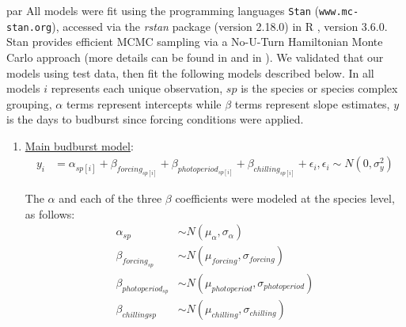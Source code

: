 \documentclass{article}
\begin{document}
par All models were fit using the programming languages \texttt{Stan} \citep{Carpenter:2016aa}(\texttt{www.mc-stan.org}), accessed via the \textit{rstan} package (version 2.18.0) in R \citep{Rcore:2017,rstan2018}, version 3.6.0. Stan provides efficient MCMC sampling via a No-U-Turn Hamiltonian Monte Carlo approach (more details can be found in \citet{BDA} and in \citet{Carpenter:2016aa}). We validated that our models using test data, then fit the following models described below. In all models $i$ represents each unique observation, $sp$ is the species or species complex grouping, $\alpha$ terms represent intercepts while $\beta$ terms represent slope estimates, $y$ is the days to budburst since forcing conditions were applied.  
\begin{enumerate}
\item \underline{Main budburst model}:
\begin{align*}
y_i &= \alpha_{sp[i]} + \beta_{forcing_{sp[i]}} + \beta_{photoperiod_{sp[i]}} + \beta_{chilling_{sp[i]}} + \epsilon_i, \epsilon_i \sim N(0,\sigma^2_y)
\end{align*}

\noindent The $\alpha$ and each of the three $\beta$ coefficients were modeled at the species level, as follows:
\begin{align*}
\alpha_{sp} & \sim N(\mu_{\alpha}, \sigma_{\alpha}) \\
\beta_{forcing_{sp}} & \sim N(\mu_{forcing}, \sigma_{forcing}) \\
\beta_{photoperiod_{sp}} & \sim N(\mu_{photoperiod}, \sigma_{photoperiod})\\
\beta_{chilling{sp}} & \sim N(\mu_{chilling}, \sigma_{chilling})
\end{align*}


\end{enumerate}
\end{document}
